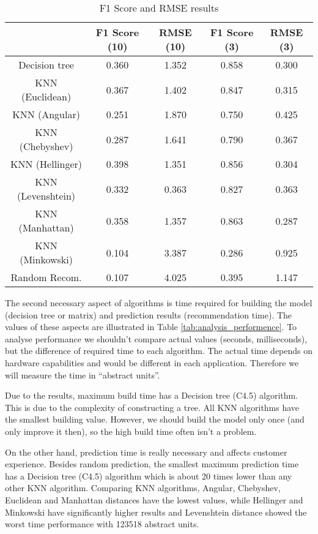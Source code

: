 \begin{table}[h]
    \centering
    {\small
    \begin{tabular}{|c|c|c|c|c|}
        \hline
         & F1 Score (10) & RMSE (10) & F1 Score (3) & RMSE (3) \\        
        \hline
        Decision tree       & 0.360 & 1.352 & 0.858& 0.300\\
        \hline
        KNN (Euclidean)     & 0.367 & 1.402 & 0.847 & 0.315\\
        \hline
        KNN (Angular)       & 0.251 &1.870 & 0.750 & 0.425\\
        \hline
        KNN (Chebyshev)     & 0.287	& 1.641& 0.790 & 0.367\\
        \hline
        KNN (Hellinger)     & 0.398 & 1.351 & 0.856 & 0.304\\
        \hline
        KNN (Levenshtein)   & 0.332 & 0.363 & 0.827 & 0.363\\
        \hline
        KNN (Manhattan)     & 0.358 & 1.357 & 0.863 & 0.287\\
        \hline
        KNN (Minkowski)     & 0.104	& 3.387 & 0.286 & 0.925\\
        \hline
        Random Recom.       & 0.107 & 4.025 & 0.395 & 1.147\\
        \hline
    \end{tabular}
    }
    \caption{F1 Score and RMSE results}\label{tab:analysis_scores}
\end{table}

The second necessary aspect of algorithms is time required for building the model (decision tree or matrix) and prediction results (recommendation time). The values of these aspects are illustrated in Table \ref{tab:analysis_performence}. To analyse performance we shouldn't compare actual values (seconds, milliseconds), but the difference of required time to each algorithm. The actual time depends on hardware capabilities and would be different in each application. Therefore we will measure the time in “abstract units”.

Due to the results, maximum build time has a Decision tree (C4.5) algorithm. This is due to the complexity of constructing a tree. All KNN algorithms have the smallest building value. However, we should build the model only once (and only improve it then), so the high build time often isn't a problem.

On the other hand, prediction time is really necessary and affects customer experience. Besides random prediction, the smallest maximum prediction time has a Decision tree (C4.5) algorithm which is about 20 times lower than any other KNN algorithm. Comparing KNN algorithms, Angular, Chebyshev, Euclidean and Manhattan distances have the lowest values, while Hellinger and Minkowski have significantly higher results and Levenshtein distance showed the worst time performance with 123518 abstract units.

